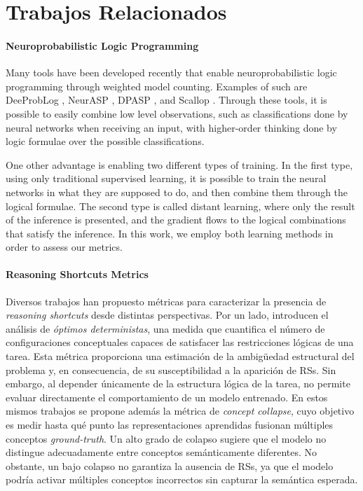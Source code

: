 \documentclass[12pt]{article}
\begin{document}
\section{Trabajos Relacionados} \label{sec:relatedwork}

\paragraph{Neuroprobabilistic Logic Programming}  Many tools have been developed recently that enable neuroprobabilistic logic programming through weighted model counting. Examples of such are DeeProbLog \cite{DeepProbLog-Neurips,DeepProbLog-AI}, NeurASP \cite{NeurASP}, DPASP \cite{DPASP-Arxiv,DPASP-KR}, and Scallop \cite{Scallop-NEURIPS,Scallop-ACM}. Through these tools, it is possible to easily combine low level observations, such as classifications done by neural networks when receiving an input, with higher-order thinking done by logic formulae over the possible classifications. 

One other advantage is enabling two different types of training. In the first type, using only traditional supervised learning, it is possible to train the neural networks in what they are supposed to do, and then combine them through the logical formulae. The second type is called distant learning, where only the result of the inference is presented, and the gradient flows to the logical combinations that satisfy the inference. In this work, we employ both learning methods in order to assess our metrics. 

\paragraph{Reasoning Shortcuts Metrics}
Diversos trabajos han propuesto métricas para caracterizar la presencia de \textit{reasoning shortcuts} desde distintas perspectivas. Por un lado, \cite{Bortolotti2024, Marconato2023-NotAll} introducen el análisis de \textit{óptimos deterministas}, una medida que cuantifica el número de configuraciones conceptuales capaces de satisfacer las restricciones lógicas de una tarea. Esta métrica proporciona una estimación de la ambigüedad estructural del problema y, en consecuencia, de su susceptibilidad a la aparición de RSs. Sin embargo, al depender únicamente de la estructura lógica de la tarea, no permite evaluar directamente el comportamiento de un modelo entrenado. En estos mismos trabajos se propone además la métrica de \textit{concept collapse}, cuyo objetivo es medir hasta qué punto las representaciones aprendidas fusionan múltiples conceptos \textit{ground-truth}. Un alto grado de colapso sugiere que el modelo no distingue adecuadamente entre conceptos semánticamente diferentes. No obstante, un bajo colapso no garantiza la ausencia de RSs, ya que el modelo podría activar múltiples conceptos incorrectos sin capturar la semántica esperada.
\end{document}
